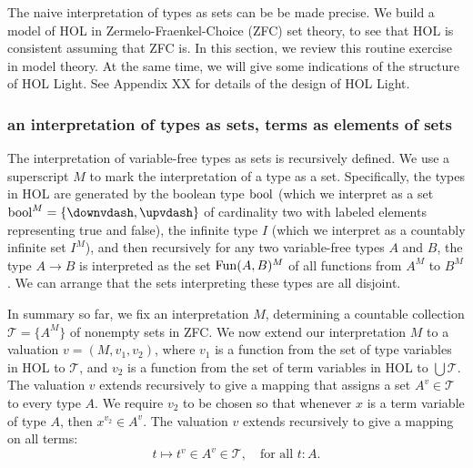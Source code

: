 \documentclass[brochure,english,12pt]{bourbaki}
\theoremstyle{plain}
\def\T{{\mathcal T}}
\begin{document}
The naive interpretation of types as sets can be be made precise.
We build a model of HOL in Zermelo-Fraenkel-Choice (ZFC) set theory, to see that HOL is consistent assuming that ZFC is.
In this section, we review this routine exercise in model theory.  
At the same time, we will give some indications of the structure of HOL Light.
See Appendix XX for details of the design of HOL Light.



\subsubsection{an interpretation of types as sets, terms as elements of sets}

The interpretation
of variable-free types as sets is recursively defined.  We use a superscript $M$ to mark the interpretation
of a type as a set.  Specifically, the types in HOL are generated by
the boolean type ${\operatorname{bool}}$ (which we interpret as a set $\bool^M=\{\downvdash ,\upvdash \}$ 
of cardinality two with labeled elements representing true and false),
the infinite type $I$ (which we interpret as a countably infinite set $I^M$),
and then recursively for any two variable-free types $A$ and $B$, the type $A\to B$ is interpreted
as the set ${\operatorname{Fun}}(A,B)^M$ of all functions from $A^M$ to $B^M$.
We can arrange that the sets interpreting these types are all disjoint.


In summary so far,
we fix an interpretation $M$, determining a countable collection $\T =\{A^M\}$ of nonempty sets in 
ZFC.  
We now extend our interpretation $M$ to a valuation $v=(M,v_1,v_2)$, where $v_1$ is a function
from the set of type variables in HOL to $\T$, and $v_2$ is a function from the set of term
variables in HOL to $\bigcup\T$.
The valuation $v$ extends recursively to give a mapping that assigns
a set $A^{v}\in \T$ to every type $A$.  We require $v_2$ to be chosen so that whenever $x$ is a term variable of type $A$,
then $x^{v_2} \in A^v$.  The valuation $v$ extends recursively to give a mapping on all terms:
\[
t\mapsto t^v \in A^v \in \T, \quad \text{for all } t:A.
\]
\end{document}
